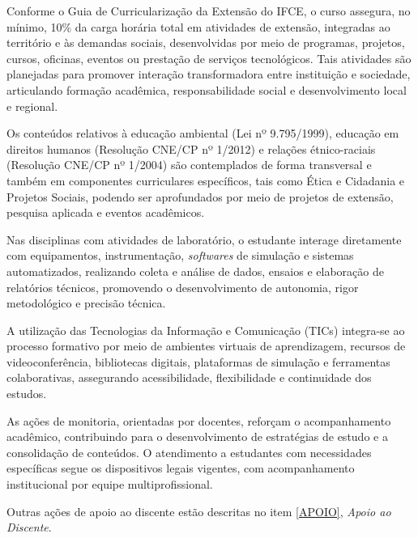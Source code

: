 Conforme o Guia de Curricularização da Extensão do IFCE, o curso assegura, no mínimo, 10\% da carga horária total em atividades de extensão, integradas ao território e às demandas sociais, desenvolvidas por meio de programas, projetos, cursos, oficinas, eventos ou prestação de serviços tecnológicos. Tais atividades são planejadas para promover interação transformadora entre instituição e sociedade, articulando formação acadêmica, responsabilidade social e desenvolvimento local e regional.

Os conteúdos relativos à educação ambiental (Lei nº 9.795/1999), educação em direitos humanos (Resolução CNE/CP nº 1/2012) e relações étnico-raciais (Resolução CNE/CP nº 1/2004) são contemplados de forma transversal e também em componentes curriculares específicos, tais como Ética e Cidadania e Projetos Sociais, podendo ser aprofundados por meio de projetos de extensão, pesquisa aplicada e eventos acadêmicos.

Nas disciplinas com atividades de laboratório, o estudante interage diretamente com equipamentos, instrumentação, \textit{softwares} de simulação e sistemas automatizados, realizando coleta e análise de dados, ensaios e elaboração de relatórios técnicos, promovendo o desenvolvimento de autonomia, rigor metodológico e precisão técnica.

A utilização das Tecnologias da Informação e Comunicação (TICs) integra-se ao processo formativo por meio de ambientes virtuais de aprendizagem, recursos de videoconferência, bibliotecas digitais, plataformas de simulação e ferramentas colaborativas, assegurando acessibilidade, flexibilidade e continuidade dos estudos.

As ações de monitoria, orientadas por docentes, reforçam o acompanhamento acadêmico, contribuindo para o desenvolvimento de estratégias de estudo e a consolidação de conteúdos. O atendimento a estudantes com necessidades específicas segue os dispositivos legais vigentes, com acompanhamento institucional por equipe multiprofissional.

Outras ações de apoio ao discente estão descritas no item \ref{APOIO}, \textit{Apoio ao Discente}.
